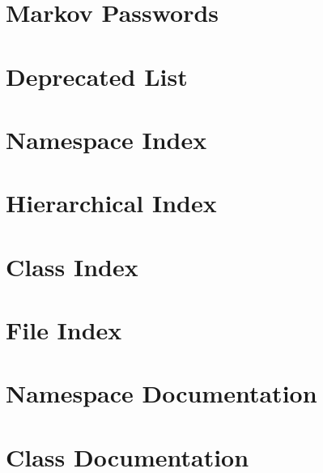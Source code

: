 \let\mypdfximage\pdfximage\def\pdfximage{\immediate\mypdfximage}\documentclass[twoside]{book}
\newcommand{\+}{\discretionary{\mbox{\scriptsize$\hookleftarrow$}}{}{}}
\begin{document}
\chapter{Markov Passwords}
\label{index}\hypertarget{index}{}
\chapter{Deprecated List}
\label{deprecated}

\chapter{Namespace Index}

\chapter{Hierarchical Index}

\chapter{Class Index}

\chapter{File Index}

\chapter{Namespace Documentation}

















\chapter{Class Documentation}


















\end{document}
